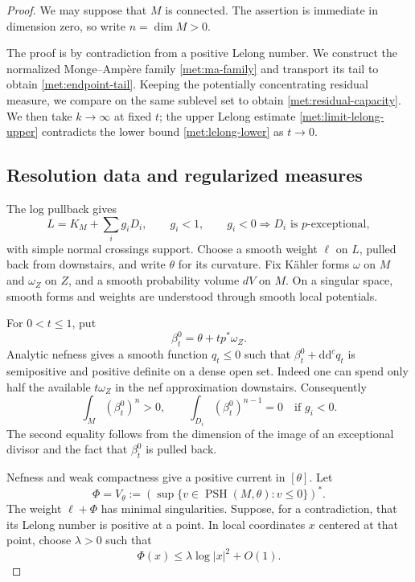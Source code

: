 \documentclass[11pt,letterpaper]{article}
\newcommand{\ddc}{\mathrm{d}\mathrm{d}^{c}}
\theoremstyle{definition}
\theoremstyle{remark}
\begin{document}
\begin{proof}
We may suppose that \(M\) is connected.  The assertion is immediate in
dimension zero, so write \(n=\dim M>0\).

The proof is by contradiction from a positive Lelong number. We construct
the normalized Monge--Amp\`ere family \eqref{met:ma-family} and transport
its tail to obtain \eqref{met:endpoint-tail}. Keeping the potentially
concentrating residual measure, we compare on the same sublevel set to
obtain \eqref{met:residual-capacity}. We then take \(k\to\infty\) at
fixed \(t\); the upper Lelong estimate \eqref{met:limit-lelong-upper}
contradicts the lower bound \eqref{met:lelong-lower} as \(t\to0\).

\subsection*{Resolution data and regularized measures}

The log pullback gives
\begin{equation}
 \label{met:adjoint-data}
 L=K_M+\sum_i g_iD_i,
 \qquad g_i<1,
 \qquad g_i<0\Longrightarrow D_i\text{ is }p\text{-exceptional},
\end{equation}
with simple normal crossings support.  Choose a smooth weight \(\ell\)
on \(L\), pulled back from downstairs, and write \(\theta\) for its
curvature.  Fix K\"ahler forms \(\omega\) on \(M\) and \(\omega_Z\) on
\(Z\), and a smooth probability volume \(dV\) on \(M\).  On a singular
space, smooth forms and weights are understood through smooth local
potentials.

For \(0<t\leq1\), put
\begin{equation}
 \label{met:beta-zero}
 \beta_t^0=\theta+t p^*\omega_Z.
\end{equation}
Analytic nefness gives a smooth function \(q_t\leq0\) such that
\(\beta_t^0+\ddc q_t\) is semipositive and positive definite on a dense
open set.  Indeed one can spend only half the available \(t\omega_Z\)
in the nef approximation downstairs.  Consequently
\begin{equation}
 \label{met:exceptional-degree}
 \int_M(\beta_t^0)^n>0,
 \qquad
 \int_{D_i}(\beta_t^0)^{n-1}=0\quad\text{if }g_i<0.
\end{equation}
The second equality follows from the dimension of the image of an
exceptional divisor and the fact that \(\beta_t^0\) is pulled back.

Nefness and weak compactness give a positive current in \([\theta]\).
Let
\begin{equation}
 \label{met:minimal-envelope}
 \Phi=V_\theta
 :=\left(\sup\{v\in\operatorname{PSH}(M,\theta):v\leq0\}\right)^*.
\end{equation}
The weight \(\ell+\Phi\) has minimal singularities.  Suppose, for a
contradiction, that its Lelong number is positive at a point.  In local
coordinates \(x\) centered at that point, choose \(\lambda>0\) such that
\begin{equation}
 \label{met:assumed-pole}
 \Phi(x)\leq\lambda\log|x|^2+O(1).
\end{equation}


\end{proof}
\end{document}
